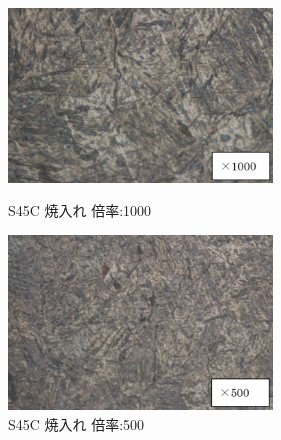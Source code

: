 \documentclass[10pt,a4j]{jsarticle}
\begin{document}
  \begin{figure}[htbp]
    \begin{minipage}{0.5\hsize}
      \begin{center}
        \includegraphics[width=7cm]{../img/S45C_yakiire_1000.png}
        \caption{S45C 焼入れ 倍率:1000}
      \end{center}
    \end{minipage}
    \begin{minipage}{0.5\hsize}
      \begin{center}
        \includegraphics[width=7cm]{../img/S45C_yakiire_500.png}
        \caption{S45C 焼入れ 倍率:500}
      \end{center}
    \end{minipage}
  \end{figure}
\end{document}
